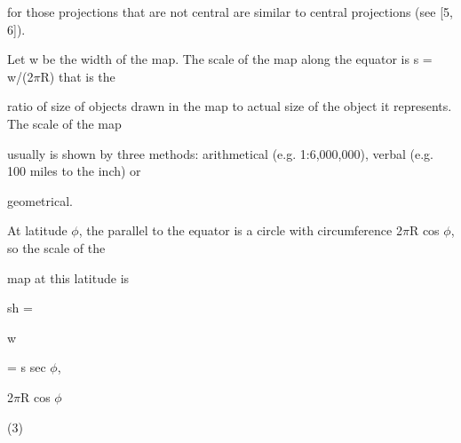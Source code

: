 \documentclass[a4paper,portrait,12pt]{article}
\begin{document}
\begin{flushleft}
for those projections that are not central are similar to central projections (see [5, 6]).
\end{flushleft}


\begin{flushleft}
Let w be the width of the map. The scale of the map along the equator is s = w/(2$\pi$R) that is the
\end{flushleft}


\begin{flushleft}
ratio of size of objects drawn in the map to actual size of the object it represents. The scale of the map
\end{flushleft}


\begin{flushleft}
usually is shown by three methods: arithmetical (e.g. 1:6,000,000), verbal (e.g. 100 miles to the inch) or
\end{flushleft}


\begin{flushleft}
geometrical.
\end{flushleft}


\begin{flushleft}
At latitude $\phi$, the parallel to the equator is a circle with circumference 2$\pi$R cos $\phi$, so the scale of the
\end{flushleft}


\begin{flushleft}
map at this latitude is
\end{flushleft}


\begin{flushleft}
sh =
\end{flushleft}





\begin{flushleft}
w
\end{flushleft}


\begin{flushleft}
= s sec $\phi$,
\end{flushleft}


\begin{flushleft}
2$\pi$R cos $\phi$
\end{flushleft}





(3)
\end{document}

